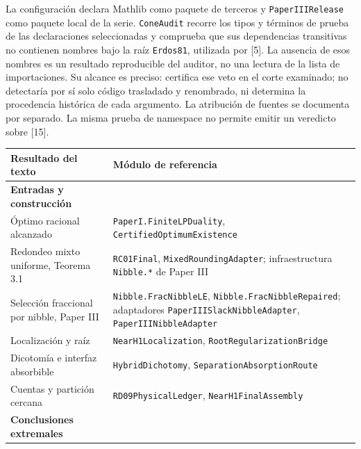 \documentclass[spanish,11pt,a4paper]{article}
\newcounter{none}
\begin{document}
La configuración declara Mathlib como paquete de terceros y \nolinkurl{PaperIIIRelease} como paquete local de la serie. \nolinkurl{ConeAudit} recorre los tipos y términos de prueba de las declaraciones seleccionadas y comprueba que sus dependencias transitivas no contienen nombres bajo la raíz \nolinkurl{Erdos81}, utilizada por {[}5{]}. La ausencia de esos nombres es un resultado reproducible del auditor, no una lectura de la lista de importaciones. Su alcance es preciso: certifica ese veto en el corte examinado; no detectaría por sí solo código trasladado y renombrado, ni determina la procedencia histórica de cada argumento. La atribución de fuentes se documenta por separado. La misma prueba de namespace no permite emitir un veredicto sobre {[}15{]}.

{\def\LTcaptype{none} %
\begin{longtable}[c]{@{}
  >{\raggedright\arraybackslash}p{}
  >{\raggedright\arraybackslash}p{}@{}}
\toprule\noalign{}
\begin{minipage}[b]{\linewidth}\raggedright
Resultado del texto
\end{minipage} & \begin{minipage}[b]{\linewidth}\raggedright
Módulo de referencia
\end{minipage} \\
\midrule\noalign{}
\endhead
\bottomrule\noalign{}
\endlastfoot
\textbf{Entradas y construcción} & \\
Óptimo racional alcanzado & \nolinkurl{PaperI.FiniteLPDuality}, \nolinkurl{CertifiedOptimumExistence} \\
Redondeo mixto uniforme, Teorema 3.1 & \nolinkurl{RC01Final}, \nolinkurl{MixedRoundingAdapter}; infraestructura \nolinkurl{Nibble.*} de Paper III \\
Selección fraccional por nibble, Paper III & \nolinkurl{Nibble.FracNibbleLE}, \nolinkurl{Nibble.FracNibbleRepaired}; adaptadores \nolinkurl{PaperIIISlackNibbleAdapter}, \nolinkurl{PaperIIINibbleAdapter} \\
Localización y raíz & \nolinkurl{NearH1Localization}, \nolinkurl{RootRegularizationBridge} \\
Dicotomía e interfaz absorbible & \nolinkurl{HybridDichotomy}, \nolinkurl{SeparationAbsorptionRoute} \\
Cuentas y partición cercana & \nolinkurl{RD09PhysicalLedger}, \nolinkurl{NearH1FinalAssembly} \\
\textbf{Conclusiones extremales} & \\

\end{longtable}}
\end{document}
